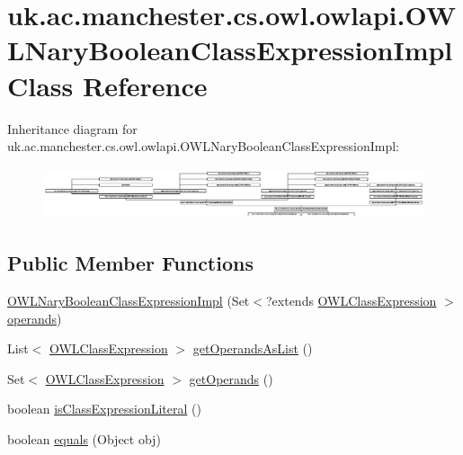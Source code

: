 \hypertarget{classuk_1_1ac_1_1manchester_1_1cs_1_1owl_1_1owlapi_1_1_o_w_l_nary_boolean_class_expression_impl}{\section{uk.\-ac.\-manchester.\-cs.\-owl.\-owlapi.\-O\-W\-L\-Nary\-Boolean\-Class\-Expression\-Impl Class Reference}
\label{classuk_1_1ac_1_1manchester_1_1cs_1_1owl_1_1owlapi_1_1_o_w_l_nary_boolean_class_expression_impl}
}
Inheritance diagram for uk.\-ac.\-manchester.\-cs.\-owl.\-owlapi.\-O\-W\-L\-Nary\-Boolean\-Class\-Expression\-Impl\-:\begin{figure}[H]
\begin{center}
\leavevmode
\includegraphics[height=1.520190cm]{classuk_1_1ac_1_1manchester_1_1cs_1_1owl_1_1owlapi_1_1_o_w_l_nary_boolean_class_expression_impl}
\end{center}
\end{figure}
\subsection*{Public Member Functions}
\begin{DoxyCompactItemize}
\item 
\hyperlink{classuk_1_1ac_1_1manchester_1_1cs_1_1owl_1_1owlapi_1_1_o_w_l_nary_boolean_class_expression_impl_a66c58a785d0f3d0c43f40e364320893d}{O\-W\-L\-Nary\-Boolean\-Class\-Expression\-Impl} (Set$<$?extends \hyperlink{interfaceorg_1_1semanticweb_1_1owlapi_1_1model_1_1_o_w_l_class_expression}{O\-W\-L\-Class\-Expression} $>$ \hyperlink{classuk_1_1ac_1_1manchester_1_1cs_1_1owl_1_1owlapi_1_1_o_w_l_nary_boolean_class_expression_impl_af6e58b4bd9107f35125d03637c9dcb0f}{operands})
\item 
List$<$ \hyperlink{interfaceorg_1_1semanticweb_1_1owlapi_1_1model_1_1_o_w_l_class_expression}{O\-W\-L\-Class\-Expression} $>$ \hyperlink{classuk_1_1ac_1_1manchester_1_1cs_1_1owl_1_1owlapi_1_1_o_w_l_nary_boolean_class_expression_impl_aa5a21dd0b63c1b2c8fe5664e763263fa}{get\-Operands\-As\-List} ()
\item 
Set$<$ \hyperlink{interfaceorg_1_1semanticweb_1_1owlapi_1_1model_1_1_o_w_l_class_expression}{O\-W\-L\-Class\-Expression} $>$ \hyperlink{classuk_1_1ac_1_1manchester_1_1cs_1_1owl_1_1owlapi_1_1_o_w_l_nary_boolean_class_expression_impl_a4bb5add4649bf52050f6c7c3b4f48f81}{get\-Operands} ()
\item 
boolean \hyperlink{classuk_1_1ac_1_1manchester_1_1cs_1_1owl_1_1owlapi_1_1_o_w_l_nary_boolean_class_expression_impl_a3ecbfd89dfcfafdde34d9417e4ac8a5c}{is\-Class\-Expression\-Literal} ()
\item 
boolean \hyperlink{classuk_1_1ac_1_1manchester_1_1cs_1_1owl_1_1owlapi_1_1_o_w_l_nary_boolean_class_expression_impl_af962842619e9c1908f5dbc8ea79f85c5}{equals} (Object obj)
\end{DoxyCompactItemize}
